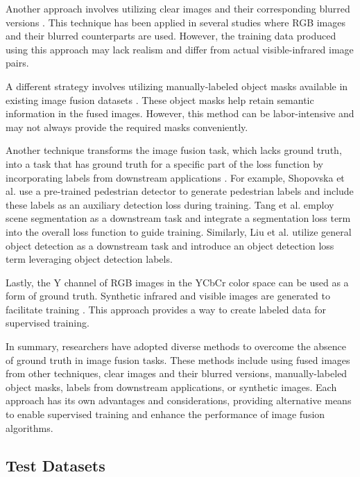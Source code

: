 Another approach involves utilizing clear images and their corresponding blurred versions \cite{zhang2020ifcnn, liu2018infrared, wang2019generative, feng2020fully, luo2021ifsepr, zhu2022iplf}. This technique has been applied in several studies where RGB images and their blurred counterparts are used. However, the training data produced using this approach may lack realism and differ from actual visible-infrared image pairs.

A different strategy involves utilizing manually-labeled object masks available in existing image fusion datasets \cite{ma2021stdfusionnet}. These object masks help retain semantic information in the fused images. However, this method can be labor-intensive and may not always provide the required masks conveniently.

Another technique transforms the image fusion task, which lacks ground truth, into a task that has ground truth for a specific part of the loss function by incorporating labels from downstream applications \cite{shopovska2019deep, tang2022image, liu2022target}. For example, Shopovska et al. \cite{shopovska2019deep} use a pre-trained pedestrian detector to generate pedestrian labels and include these labels as an auxiliary detection loss during training. Tang et al. \cite{tang2022image} employ scene segmentation as a downstream task and integrate a segmentation loss term into the overall loss function to guide training. Similarly, Liu et al. \cite{liu2022target} utilize general object detection as a downstream task and introduce an object detection loss term leveraging object detection labels.

Lastly, the Y channel of RGB images in the YCbCr color space can be used as a form of ground truth. Synthetic infrared and visible images are generated to facilitate training \cite{luo2021latraivf}. This approach provides a way to create labeled data for supervised training.

In summary, researchers have adopted diverse methods to overcome the absence of ground truth in image fusion tasks. These methods include using fused images from other techniques, clear images and their blurred versions, manually-labeled object masks, labels from downstream applications, or synthetic images. Each approach has its own advantages and considerations, providing alternative means to enable supervised training and enhance the performance of image fusion algorithms.

\subsection{Test Datasets}
\label{subsec:Test}

